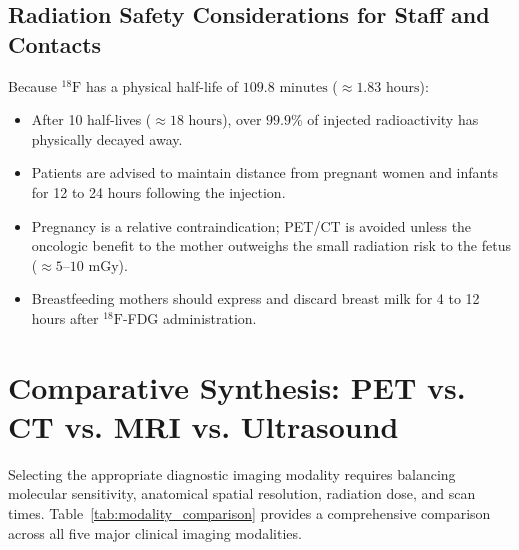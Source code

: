 \documentclass[11pt,a4paper]{article}
\begin{document}
\subsection{Radiation Safety Considerations for Staff and Contacts}
Because $^{18}\text{F}$ has a physical half-life of $109.8\text{ minutes}$ ($\approx 1.83\text{ hours}$):
\begin{itemize}
    \item After 10 half-lives ($\approx 18\text{ hours}$), over $99.9\%$ of injected radioactivity has physically decayed away.
    \item Patients are advised to maintain distance from pregnant women and infants for 12 to 24 hours following the injection.
    \item Pregnancy is a relative contraindication; PET/CT is avoided unless the oncologic benefit to the mother outweighs the small radiation risk to the fetus ($\approx 5\text{--}10\text{ mGy}$).
    \item Breastfeeding mothers should express and discard breast milk for 4 to 12 hours after $^{18}\text{F}$-FDG administration.
\end{itemize}

\section{Comparative Synthesis: PET vs. CT vs. MRI vs. Ultrasound}

Selecting the appropriate diagnostic imaging modality requires balancing molecular sensitivity, anatomical spatial resolution, radiation dose, and scan times. Table~\ref{tab:modality_comparison} provides a comprehensive comparison across all five major clinical imaging modalities.
\end{document}
